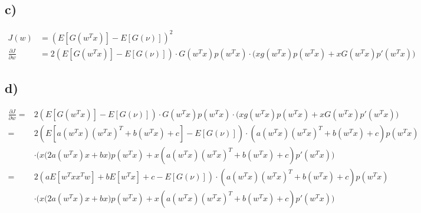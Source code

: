 \documentclass[paper=a4,fontsize=10pt,DIV11,BCOR10mm]{scrartcl}
\begin{document}
\subsection*{c)}
\begin{align*}
J(w) &= (E[G(w^Tx)] - E[G(\nu)])^2 \\
\frac{\partial J}{\partial w} &= 2(E[G(w^Tx)] - E[G(\nu)]) \cdot G(w^Tx)p(w^Tx) \cdot \big( xg(w^Tx) p(w^Tx) + xG(w^Tx)p'(w^Tx)\big)
\end{align*}

\subsection*{d)}
\begin{align*}
\frac{\partial J}{\partial w} =& 2(E[G(w^Tx)] - E[G(\nu)]) \cdot G(w^Tx)p(w^Tx) \cdot \big( xg(w^Tx) p(w^Tx) + xG(w^Tx)p'(w^Tx)\big) \\
=& 2(E[a(w^Tx)(w^Tx)^T + b(w^Tx) + c] - E[G(\nu)]) \cdot (a(w^Tx)(w^Tx)^T + b(w^Tx) + c)p(w^Tx)\\&
 \cdot \bigg( x\big(2a(w^Tx)x + bx\big) p(w^Tx) + x(a(w^Tx)(w^Tx)^T + b(w^Tx) + c)p'(w^Tx)\bigg) \\
=& 2(aE[w^Txx^Tw] + bE[w^Tx] + c - E[G(\nu)]) \cdot (a(w^Tx)(w^Tx)^T + b(w^Tx) + c)p(w^Tx)\\&
 \cdot \bigg( x\big(2a(w^Tx)x + bx\big) p(w^Tx) + x(a(w^Tx)(w^Tx)^T + b(w^Tx) + c)p'(w^Tx)\bigg) \\
\end{align*}



\end{document}
